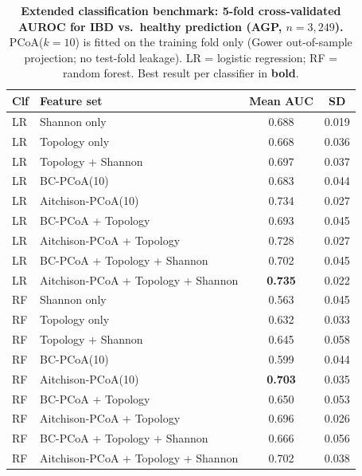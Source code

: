 \begin{table}[H]
\centering
\caption{%
  \textbf{Extended classification benchmark: 5-fold cross-validated AUROC for
  IBD vs.\ healthy prediction (AGP, $n = 3{,}249$).}
  PCoA($k{=}10$) is fitted on the training fold only (Gower out-of-sample
  projection; no test-fold leakage).
  LR = logistic regression; RF = random forest.
  Best result per classifier in \textbf{bold}.
}
\label{tab:classification}
\small
\setlength{\tabcolsep}{7pt}
\begin{tabular}{llcc}
\toprule
\textbf{Clf} & \textbf{Feature set} & \textbf{Mean AUC} & \textbf{SD} \\
\midrule
LR & Shannon only                        & 0.688 & 0.019 \\
LR & Topology only                       & 0.668 & 0.036 \\
LR & Topology + Shannon                  & 0.697 & 0.037 \\
LR & BC-PCoA(10)                         & 0.683 & 0.044 \\
LR & Aitchison-PCoA(10)                  & 0.734 & 0.027 \\
LR & BC-PCoA + Topology                  & 0.693 & 0.045 \\
LR & Aitchison-PCoA + Topology           & 0.728 & 0.027 \\
LR & BC-PCoA + Topology + Shannon        & 0.702 & 0.045 \\
LR & Aitchison-PCoA + Topology + Shannon & \textbf{0.735} & 0.022 \\
\midrule
RF & Shannon only                        & 0.563 & 0.045 \\
RF & Topology only                       & 0.632 & 0.033 \\
RF & Topology + Shannon                  & 0.645 & 0.058 \\
RF & BC-PCoA(10)                         & 0.599 & 0.044 \\
RF & Aitchison-PCoA(10)                  & \textbf{0.703} & 0.035 \\
RF & BC-PCoA + Topology                  & 0.650 & 0.053 \\
RF & Aitchison-PCoA + Topology           & 0.696 & 0.026 \\
RF & BC-PCoA + Topology + Shannon        & 0.666 & 0.056 \\
RF & Aitchison-PCoA + Topology + Shannon & 0.702 & 0.038 \\
\bottomrule
\end{tabular}
\end{table}

